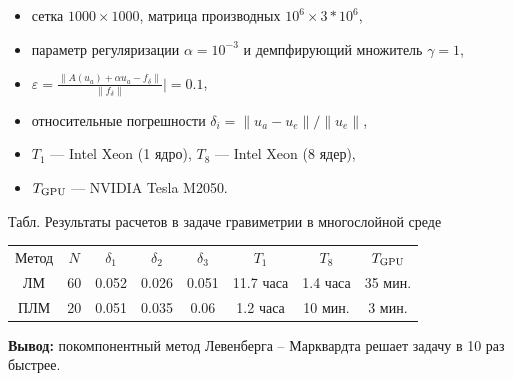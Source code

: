 \documentclass[10pt,pdf, mathserif, hyperref={unicode}]{beamer}
\begin{document}
\begin{frame}
	\begin{itemize}
		\item сетка $1000\times1000$, матрица производных $10^6\times 3*10^6$,
		\item параметр регуляризации $\alpha=10^{-3}$ и демпфирующий множитель $\gamma=1$,
		\item $\varepsilon=\frac{\|A(u_a)+\alpha u_a-f_\delta\|}{\|f_\delta\|}|=0.1$,
		\item относительные погрешности $\delta_i=\|u_a-u_e\|/\|u_e\|$,
		\item $T_1$ --- Intel Xeon (1 ядро), $T_8$ --- Intel Xeon (8 ядер),	
		\item $T_{\textup{GPU}}$ --- NVIDIA Tesla M2050.
	\end{itemize}
	\begin{table} 
		\centering
		\renewcommand{\arraystretch}{1.5} 
		{\scriptsize Табл. Результаты расчетов в задаче гравиметрии в многослойной среде}
		\small
\begin{tabular}{|c|c|c|c|c|c|c|c|}
\hline
\multirow{2}{*}{Метод} & \multirow{2}{*}{$N$} & \multirow{2}{*}{$\delta_1$} & \multirow{2}{*}{$\delta_2$} & \multirow{2}{*}{$\delta_3$} & \multirow{2}{*}{$T_1$} & \multirow{2}{*}{$T_8$} & \multirow{2}{*}{$T_{\textup{GPU}}$} \\
                       &                      &                             &                             &                             &                        &                        &                                     \\ \hline
ЛМ                     & 60                   & 0.052                       & 0.026                       & 0.051                       & 11.7 часа                & 1.4 часа                 & 35 мин.                             \\ \hline
\rowcolor{Green}
ПЛМ                    & 20                   & 0.051                       & 0.035                       & 0.06                        & 1.2 часа                 & 10 мин.                & 3 мин.                              \\ \hline
\end{tabular}
	\end{table}

\textbf{\color{blue}Вывод:} покомпонентный метод Левенберга -- Марквардта решает задачу в 10 раз быстрее.
\end{frame}
\end{document}
